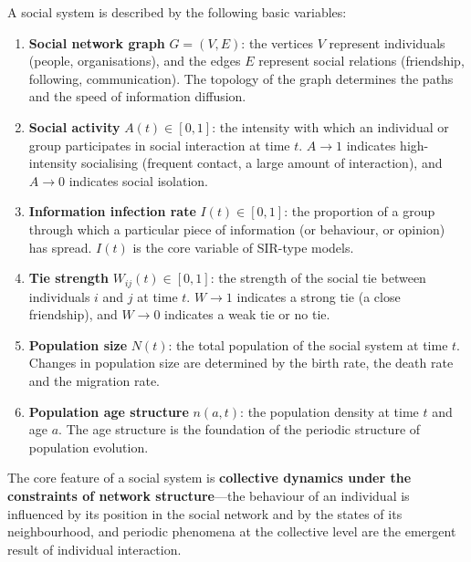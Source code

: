 \begin{definition}\label{def:social_quantities}
A social system is described by the following basic variables:
\begin{enumerate}[label=(\roman*)]
    \item \textbf{Social network graph} $G = (V, E)$: the vertices $V$ represent individuals (people, organisations), and the edges $E$ represent social relations (friendship, following, communication). The topology of the graph determines the paths and the speed of information diffusion.
    \item \textbf{Social activity} $A(t) \in [0,1]$: the intensity with which an individual or group participates in social interaction at time $t$. $A \to 1$ indicates high-intensity socialising (frequent contact, a large amount of interaction), and $A \to 0$ indicates social isolation.
    \item \textbf{Information infection rate} $I(t) \in [0,1]$: the proportion of a group through which a particular piece of information (or behaviour, or opinion) has spread. $I(t)$ is the core variable of SIR-type models.
    \item \textbf{Tie strength} $W_{ij}(t) \in [0,1]$: the strength of the social tie between individuals $i$ and $j$ at time $t$. $W \to 1$ indicates a strong tie (a close friendship), and $W \to 0$ indicates a weak tie or no tie.
    \item \textbf{Population size} $N(t)$: the total population of the social system at time $t$. Changes in population size are determined by the birth rate, the death rate and the migration rate.
    \item \textbf{Population age structure} $n(a, t)$: the population density at time $t$ and age $a$. The age structure is the foundation of the periodic structure of population evolution.
\end{enumerate}
The core feature of a social system is \textbf{collective dynamics under the constraints of network structure}---the behaviour of an individual is influenced by its position in the social network and by the states of its neighbourhood, and periodic phenomena at the collective level are the emergent result of individual interaction.
\end{definition}

